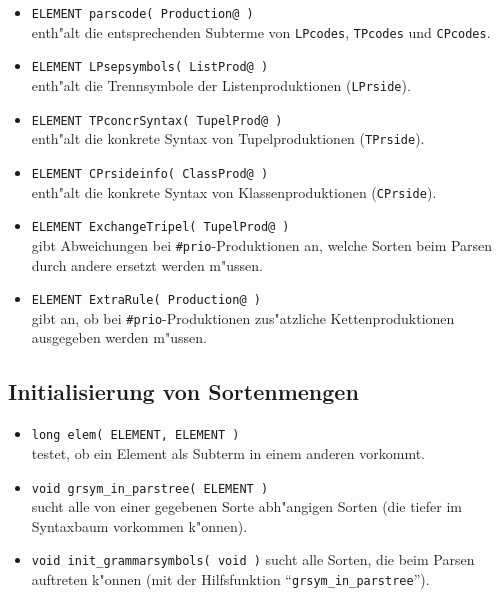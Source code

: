 \begin{itemize}
\item {\tt ELEMENT parscode( Production@ )}\\
enth"alt die entsprechenden Subterme von
{\tt LPcodes}, {\tt TPcodes} und {\tt CPcodes}.

\item {\tt ELEMENT LPsepsymbols( ListProd@ )}\\
enth"alt die Trennsymbole der Listenproduktionen ({\tt LPrside}).

\item {\tt ELEMENT TPconcrSyntax( TupelProd@ )}\\
enth"alt die konkrete Syntax von Tupelproduktionen ({\tt TPrside}).

\item {\tt ELEMENT CPrsideinfo( ClassProd@ )}\\
enth"alt die konkrete Syntax von Klassenproduktionen ({\tt CPrside}).

\item {\tt ELEMENT ExchangeTripel( TupelProd@ )}\\
gibt Abweichungen bei {\tt \#prio}-Produktionen an, welche Sorten
beim Parsen durch andere ersetzt werden m"ussen.

\item {\tt ELEMENT ExtraRule( Production@ )}\\
gibt an, ob bei {\tt \#prio}-Produktionen zus"atzliche Kettenproduktionen
ausgegeben werden m"ussen.
\end{itemize}


\subsection{Initialisierung von Sortenmengen}

\begin{itemize}
\item {\tt long elem( ELEMENT, ELEMENT )}\\
testet, ob ein Element als Subterm in einem anderen vorkommt.

\item {\tt void grsym\_in\_parstree( ELEMENT )}\\
sucht alle von einer gegebenen Sorte abh"angigen Sorten (die
tiefer im Syntaxbaum vorkommen k"onnen).

\item {\tt void init\_grammarsymbols( void )}
sucht alle Sorten, die beim Parsen auftreten k"onnen (mit der Hilfsfunktion
"`{\tt grsym\_in\_parstree}"').
\end{itemize}

